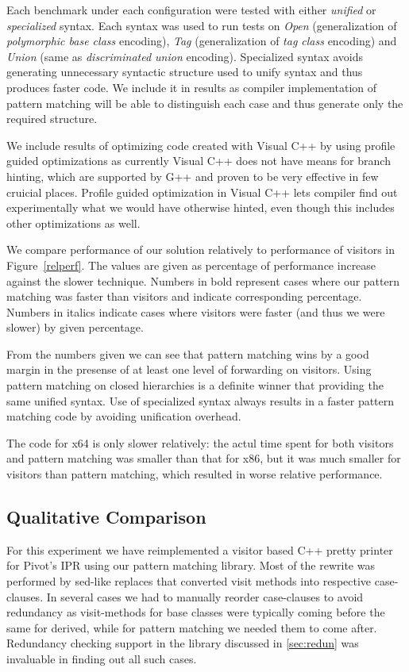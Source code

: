 \documentclass[preprint]{sigplanconf}
\begin{document}
Each benchmark under each configuration were tested with either \emph{unified} 
or \emph{specialized} syntax. Each syntax was used to run tests on \emph{Open} 
(generalization of \emph{polymorphic base class} encoding), \emph{Tag} 
(generalization of \emph{tag class} encoding) and \emph{Union} (same as 
\emph{discriminated union} encoding). Specialized syntax avoids generating 
unnecessary syntactic structure used to unify syntax and thus produces faster 
code. We include it in results as compiler implementation of pattern matching 
will be able to distinguish each case and thus generate only the required 
structure.

We include results of optimizing code created with Visual C++ by using profile 
guided optimizations as currently Visual C++ does not have means for branch 
hinting, which are supported by G++ and proven to be very effective in few 
cruicial places. Profile guided optimization in Visual C++ lets compiler find 
out experimentally what we would have otherwise hinted, even though this 
includes other optimizations as well.

We compare performance of our solution relatively to performance of visitors in 
Figure~\ref{relperf}. The values are given as percentage of performance increase 
against the slower technique. Numbers in bold represent cases where our pattern 
matching was faster than visitors and indicate corresponding percentage. Numbers 
in italics indicate cases where visitors were faster (and thus we were slower) 
by given percentage.

From the numbers given we can see that pattern matching wins by a good margin in 
the presense of at least one level of forwarding on visitors. Using pattern 
matching on closed hierarchies is a definite winner that providing the same 
unified syntax. Use of specialized syntax always results in a faster pattern 
matching code by avoiding unification overhead.

The code for x64 is only slower relatively: the actul time spent for both 
visitors and pattern matching was smaller than that for x86, but it was much 
smaller for visitors than pattern matching, which resulted in worse relative 
performance.

\subsection{Qualitative Comparison}
\label{sec:qualcmp}

For this experiment we have reimplemented a visitor based C++ pretty printer for 
Pivot's IPR using our pattern matching library. Most of the rewrite was 
performed by sed-like replaces that converted visit methods into respective 
case-clauses. In several cases we had to manually reorder case-clauses to avoid 
redundancy as visit-methods for base classes were typically coming before the 
same for derived, while for pattern matching we needed them to come after. 
Redundancy checking support in the library discussed in \textsection\ref{sec:redun}
was invaluable in finding out all such cases.
\end{document}

